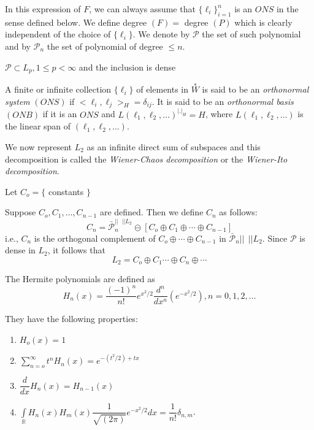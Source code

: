 In this expression of $F$, we can always assume that
$\{\ell_i\}^n_{i=1}$ is an $ONS$ in the sense defined below. We define
degree $(F)=$ degree $(P)$ which is clearly  independent of the choice
of $\{\ell_i\}$. We denote by $\mathcal{P}$ the set of such polynomial
and by $\mathcal{P}_n$ the set of polynomial of degree $\le n$. 

\begin{fact}
  $\mathcal{P} \subset L_p, 1 \le p < \infty$ and the inclusion is dense 
\end{fact}

\begin{definition}%
  A finite or infinite collection $\{\ell_i\}$ of elements in
  $\overset{\ast}{W}$ is 
  said to be an {\em orthonormal system} $(ONS)$ if $< \ell_i, \ell_j
  >_H= \delta_{ij}$. It is said to be an {\em orthonormal basis}
  $(ONB)$ if it is an $ONS$ and $L(\ell_1, \ell_2, \ldots)^{|.|_H}=H$,
  where $L(\ell_1, \ell_2, \ldots)$ is the linear span of $(\ell_1,
  \ell_2, \ldots)$.  
\end{definition}  


\medskip
{}
 We now represent $L_2$ as an
  infinite direct sum of subspaces and this decomposition is called
  the \textit{Wiener-Chaos decomposition} or the \textit{Wiener-Ito
    decomposition}. 
  
  Let $C_o=\{$ constants $\}$
  
  Suppose $C_o, C_1, \ldots, C_{n-1}$ are defined. Then we define
  $C_n$ as follows: 
  $$
  C_n= \bar{\mathcal{P}}_n^{||~~~|| L_2 } \circleddash [C_o \oplus C_1
    \oplus \cdots \oplus C_{n-1}] 
  $$\pageoriginale
  i.e.,  $C_n$ is the orthogonal complement of $C_o \oplus \cdots \oplus
  C_{n-1}$ in $\bar{\mathcal{P}}_n || ~~|| L_2$. Since $\mathcal{P}$
  is dense in $L_2$, it follows that  
  $$
  L_2= C_o \oplus C_1 \cdots \oplus C_n \oplus \cdots
  $$

\medskip
{}
 The Hermite polynomials are defined as 
  $$
  H_n(x)= \frac{(-1)^n}{n!} e^{x^2/2} \frac{d^n}{dx^n}(e^{-x^2/2}), n
  = 0,1,2, \ldots 
  $$
  
They have the following properties:
\begin{enumerate}
  \item $H_o(x)=1$ 

  \item $\sum\limits_{n=o}^{\infty}t^n H_n(x) =e^{-(t^2/2)+tx}$

  \item $\dfrac{d}{dx} H_n(x) =H_{n-1}(x)$

  \item $\int\limits_{\mathbb{R}} H_n (x) H_m(x) \dfrac{1}{\sqrt{(2
      \pi)}}e^{-x^2/2} dx = \dfrac{1}{n!} \delta_{n,m}$. 
\end{enumerate}
  
